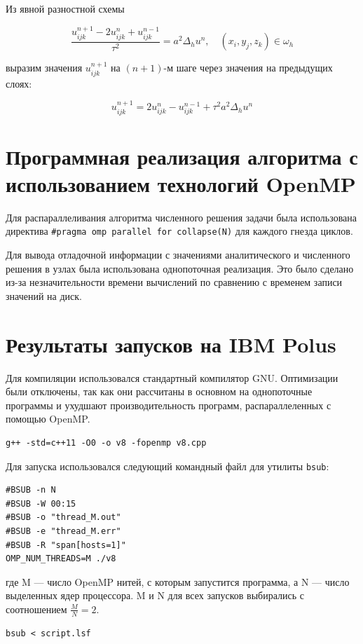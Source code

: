 \documentclass[a4paper,hidelinks,12pt]{article}
\begin{document}
Из явной разностной схемы 

\[ \frac{u^{n+1}_{ijk} - 2u^n_{ijk} + u^{n-1}_{ijk}}{ \tau^2} = a^2 \Delta_h u^n,\quad (x_i, y_j, z_k) \in \omega_h \]

\noindent выразим значения $u^{n+1}_{ijk}$ на $(n+1)$-м шаге через значения на предыдущих слоях:

\[ u^{n+1}_{ijk} = 2u^n_{ijk} - u^{n-1}_{ijk} + \tau^2 a^2 \Delta_h u^n \]

\section{Программная реализация алгоритма с использованием технологий OpenMP}

Для распараллеливания алгоритма численного решения задачи была использована директива \texttt{\#pragma omp parallel for collapse(N)} для каждого гнезда циклов.

Для вывода отладочной информации с значениями аналитического и численного решения в узлах была использована однопоточная реализация. Это было сделано из-за незначительности времени вычислений по сравнению с временем записи значений на диск.

\newpage
\section{Результаты запусков на IBM Polus}

Для компиляции использовался стандартный компилятор GNU. Оптимизации были отключены, так как они рассчитаны в основном на однопоточные программы и ухудшают производительность программ, распараллеленных с помощью OpenMP.
% 
\begin{verbatim}
g++ -std=c++11 -O0 -o v8 -fopenmp v8.cpp
\end{verbatim}

Для запуска использовался следующий командный файл для утилиты \texttt{bsub}:
% 
\begin{verbatim}
#BSUB -n N
#BSUB -W 00:15
#BSUB -o "thread_M.out"
#BSUB -e "thread_M.err"
#BSUB -R "span[hosts=1]"
OMP_NUM_THREADS=M ./v8
\end{verbatim}
% 
\noindent где M  --- число OpenMP нитей, с которым запустится программа, а N --- число выделенных ядер процессора. M и N для всех запусков выбирались с соотношением $\frac{M}{N} = 2$.
% 
\begin{verbatim}
bsub < script.lsf
\end{verbatim}
\end{document}

